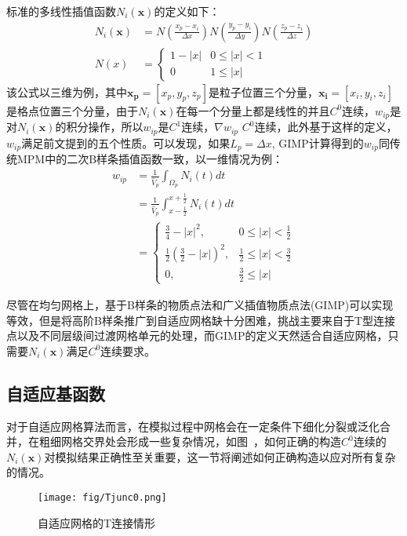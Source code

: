 标准的多线性插值函数$N_i(\mathbf{x})$的定义如下：
\begin{equation}
    \begin{aligned}
        N_i(\mathbf{x}) &= 
                N(\frac{x_p-x_i}{\Delta x})
                N(\frac{y_p-y_i}{\Delta y})
                N(\frac{z_p-z_i}{\Delta z})\\
        N(x) &=
            \begin{cases}
            1 - |x| & 0\leq |x|<1 \\
            0 & 1\leq |x|
            \end{cases}
    \end{aligned}
\end{equation}
该公式以三维为例，其中$\mathbf{x_p}=[x_p,y_p,z_p]$是粒子位置三个分量，$\mathbf{x_i}=[x_i,y_i,z_i]$是格点位置三个分量，由于$N_i(\mathbf{x})$在每一个分量上都是线性的并且$C^0$连续，$w_{ip}$是对$N_i(\mathbf{x})$的积分操作，所以$w_{ip}$是$C^1$连续，$\nabla w_{ip}$ $C^0$连续，此外基于这样的定义，$w_{ip}$满足前文提到的五个性质。可以发现，如果$L_p=\Delta x$, GIMP计算得到的$w_{ip}$同传统MPM中的二次B样条插值函数一致，以一维情况为例：
\begin{equation}
    \begin{aligned}
        w_{ip} &= \frac{1}{\hat{V}_p} \int_{\Omega_p} N_i(t) dt\\
&= \frac{1}{\hat{V}_p} \int_{x - \frac{1}{2}}^{x + \frac{1}{2}} N_i(t) dt\\
&= 
\begin{cases}
\frac{3}{4}-|x|^2, & 0 \leq |x| <\frac{1}{2}\\
\frac{1}{2}(\frac{3}{2}-|x|)^2, & \frac{1}{2}\leq |x|<\frac{3}{2}\\
0, & \frac{3}{2}\leq |x|
\end{cases}
    \end{aligned}
\end{equation}

尽管在均匀网格上，基于B样条的物质点法和广义插值物质点法(GIMP)可以实现等效，但是将高阶B样条推广到自适应网格缺十分困难，挑战主要来自于T型连接点以及不同层级间过渡网格单元的处理，而GIMP的定义天然适合自适应网格，只需要$N_i(\mathbf{x})$满足$C^0$连续要求。

\subsection{自适应基函数}
对于自适应网格算法而言，在模拟过程中网格会在一定条件下细化分裂或泛化合并，在粗细网格交界处会形成一些复杂情况，如图~\cite{fig:freeTjunk}，如何正确的构造$C^0$连续的$N_i(\mathbf{x})$对模拟结果正确性至关重要，这一节将阐述如何正确构造以应对所有复杂的情况。
\begin{figure}[H]
    \centering
    \texttt{[image: fig/Tjunc0.png]}
    \caption{自适应网格的T连接情形}
    \label{fig:freeTjunk}
\end{figure}
